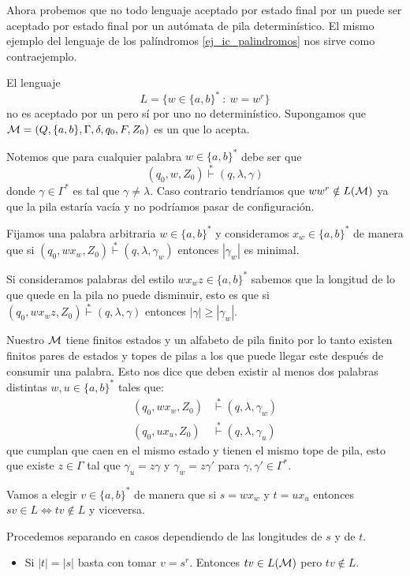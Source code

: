 \documentclass[tesis.tex]{subfiles}
\begin{document}
Ahora probemos que no todo lenguaje aceptado por estado final por un \APND puede ser aceptado por estado final por un autómata de pila determinístico.
El mismo ejemplo del lenguaje de los palíndromos \ref{ej_ic_palindromos} nos sirve como contraejemplo.
\begin{ej}
	El lenguaje 
	\[
	L = \{ w \in \{ a,b \}^*  \ : \ w = w^r \}
	\]
	no es aceptado por un \APD pero sí por uno no determinístico. 
	Supongamos que ${\cal {M}} = (Q, \{ a, b \}, \Gamma, \delta, q_0, F, Z_0)$ es un \APD que lo acepta. 
	
	
	Notemos que para cualquier palabra $w \in \{ a,b \}^*$ debe ser que
	\[
	(q_{0},w,Z_{0}) \overset{*}{\vdash} (q, \lambda, \gamma)
	\]
	donde $\gamma \in \Gamma^*$ es tal que $\gamma \neq \lambda$.
	Caso contrario tendríamos que $ww^r \notin L(\cal M)$ ya que la pila estaría vacía y no podríamos pasar de configuración.
	
	Fijamos una palabra arbitraria $w \in \{ a,b \}^*$ y consideramos $x_{w} \in \{ a, b\}^*$ de manera que si
	$(q_{0}, wx_{w}, Z_{0}) \overset{*}{\vdash} (q, \lambda, \gamma_{w})$ entonces $|\gamma_{w}|$ es minimal.
	
	
	Si consideramos palabras del estilo $wx_wz \in \{a,b\}^*$ sabemos que la longitud de lo que quede en la pila no puede disminuir, esto es que si $(q_{0}, wx_{w}z, Z_{0}) \overset{*}{\vdash} (q, \lambda, \gamma)$ entonces $|\gamma| \ge |\gamma_{w}|$.
	
	Nuestro \APD $\cal M$ tiene finitos estados y un alfabeto de pila finito por lo tanto existen finitos pares de estados y topes de pilas a los que puede llegar este \APD después de consumir una palabra.
	Esto nos dice que deben existir al menos dos palabras distintas $w, u \in \{ a, b\}^*$ tales que:
	\begin{align*}
		(q_{0}, wx_{w}, Z_{0}) & \overset{*}{\vdash} (q, \lambda, \gamma_{w}) \\
		(q_{0}, ux_{u}, Z_{0}) & \overset{*}{\vdash} (q, \lambda, \gamma_{u})
	\end{align*}
	que cumplan que caen en el mismo estado y tienen el mismo tope de pila, esto que existe $z \in \Gamma$ tal que $\gamma_{u} = z \gamma$ y $\gamma_{w} = z \gamma'$ para $\gamma, \gamma' \in \Gamma^{*}$.
	
	
	Vamos a elegir $v \in \{ a,b\}^*$ de manera que si $s = wx_{w}$ y $t = ux_{u}$ entonces $sv \in L \iff tv \notin L$ y viceversa.
	
	Procedemos separando en casos dependiendo de las longitudes de $s$ y de $t$.
	\begin{itemize}
		\item Si $|t|=|s|$ basta con tomar $v=s^r$. 
		Entonces $tv \in L({\cal M})$ pero $tv \notin L$.
		

\end{itemize}
\end{ej}
\end{document}
